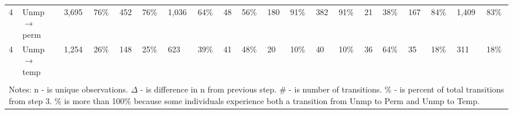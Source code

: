 \begin{tabular}{l>{\raggedright\arraybackslash}p{2in}llllllllllllllllll}
4 & Unmp $\rightarrow$ perm & 3,695 & 76\% & 452 & 76\% & 1,036 & 64\% & 48 & 56\% & 180 & 91\% & 382 & 91\% & 21 & 38\% & 167 & 84\% & 1,409 & 83\% \\ 
  4 & Unmp $\rightarrow$ temp & 1,254 & 26\% & 148 & 25\% & 623 & 39\% & 41 & 48\% & 20 & 10\% & 40 & 10\% & 36 & 64\% & 35 & 18\% & 311 & 18\% \\ 
   \hline \\[-1.8ex] \multicolumn{20}{p{12in}}{Notes: n - is unique observations.  
               $\Delta$ - is difference in n from previous step.  
               \# - is number of transitions.  
               \% - is percent of total transitions from step 3. 
               \% is more than 100\% because some individuals experience both a transition from Unmp to Perm and Unmp to Temp.} 
\end{tabular}
